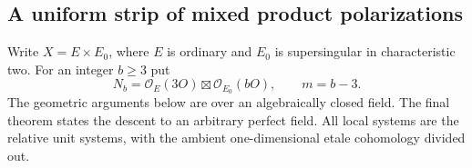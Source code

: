 \subsection{A uniform strip of mixed product polarizations}
\label{subsec:mixed-three-by-b-strip-candidate}

Write $X=E\times E_0$, where $E$ is ordinary and $E_0$ is
supersingular in characteristic two. For an integer $b\ge3$ put
\[
 N_b=\mathcal O_E(3O)\boxtimes\mathcal O_{E_0}(bO),\qquad m=b-3.
\]
The geometric arguments below are over an algebraically closed field.
The final theorem states the descent to an arbitrary perfect field.
All local systems are the relative unit systems, with the ambient
one-dimensional etale cohomology divided out.

